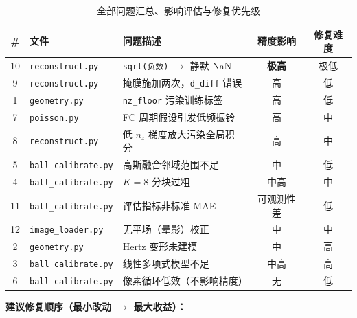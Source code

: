 \documentclass[12pt, a4paper]{ctexart}
\begin{document}
\begin{table}[h]
  \centering
  \caption{全部问题汇总、影响评估与修复优先级}
  \label{tab:summary}
  \small
  \begin{tabularx}{\textwidth}{clXcc}
    \toprule
    \textbf{\#} & \textbf{文件} & \textbf{问题描述}
                & \textbf{精度影响} & \textbf{修复难度} \\
    \midrule
    10 & \texttt{reconstruct.py}     & \texttt{sqrt(负数)} $\to$ 静默 NaN
       & \textbf{极高}  & 极低 \\
    9  & \texttt{reconstruct.py}     & 掩膜施加两次，\texttt{d\_diff} 错误
       & 高             & 低   \\
    1  & \texttt{geometry.py}        & \texttt{nz\_floor} 污染训练标签
       & 高             & 低   \\
    7  & \texttt{poisson.py}         & FC 周期假设引发低频振铃
       & 高             & 中   \\
    8  & \texttt{reconstruct.py}     & 低 $n_z$ 梯度放大污染全局积分
       & 高             & 中   \\
    5  & \texttt{ball\_calibrate.py} & 高斯融合邻域范围不足
       & 中             & 低   \\
    4  & \texttt{ball\_calibrate.py} & $K=8$ 分块过粗
       & 中高           & 中   \\
    11 & \texttt{ball\_calibrate.py} & 评估指标非标准 MAE
       & 可观测性差     & 低   \\
    12 & \texttt{image\_loader.py}   & 无平场（晕影）校正
       & 中             & 中   \\
    2  & \texttt{geometry.py}        & Hertz 变形未建模
       & 中             & 高   \\
    3  & \texttt{ball\_calibrate.py} & 线性多项式模型不足
       & 中高           & 高   \\
    6  & \texttt{ball\_calibrate.py} & 像素循环低效（不影响精度）
       & 无             & 低   \\
    \bottomrule
  \end{tabularx}
\end{table}

\noindent\textbf{建议修复顺序（最小改动 $\to$ 最大收益）：}
\end{document}
